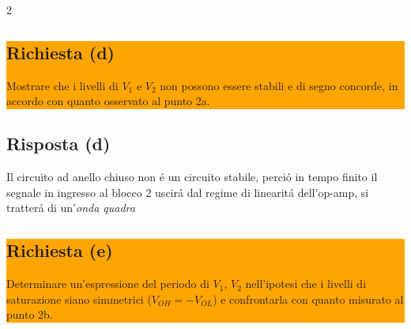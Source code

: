 \begin{multicols}{2}
  \noindent\colorbox{orange}{
    \begin{minipage}{0.9\linewidth}
      \subsection*{Richiesta (d)}
      Mostrare che i livelli di $V_1$ e $V_2$ non possono essere stabili e di segno concorde, in accordo
      con quanto osservato al punto 2a.
    \end{minipage}
  }
  \subsection*{Risposta (d)}
  Il circuito ad anello chiuso non \'e un circuito stabile, perci\'o in tempo finito il segnale in ingresso al blocco 2
  uscir\'a dal regime di linearit\'a dell'op-amp, si tratter\'a di un'\textit{onda quadra}

  \noindent\colorbox{orange}{
    \begin{minipage}{0.9\linewidth}
      \subsection*{Richiesta (e)}
      Determinare un'espressione del periodo di $V_1$, $V_2$ nell'ipotesi che i livelli di saturazione siano
      simmetrici ($V_{OH} = -V_{OL}$) e confrontarla con quanto misurato al punto 2b.
    \end{minipage}
  }
\end{multicols}
